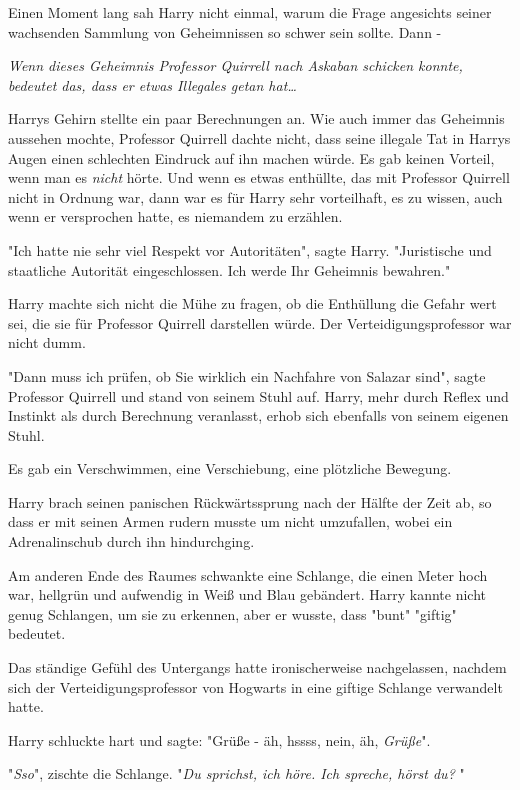 {Einen Moment lang sah Harry nicht einmal, warum die Frage angesichts seiner wachsenden Sammlung von Geheimnissen so schwer sein sollte. Dann -

\emph{Wenn dieses Geheimnis Professor Quirrell nach Askaban schicken konnte, bedeutet das, dass er etwas Illegales getan hat…}

Harrys Gehirn stellte ein paar Berechnungen an. Wie auch immer das Geheimnis aussehen mochte, Professor Quirrell dachte nicht, dass seine illegale Tat in Harrys Augen einen schlechten Eindruck auf ihn machen würde. Es gab keinen Vorteil, wenn man es \emph{nicht} hörte. Und wenn es etwas enthüllte, das mit Professor Quirrell nicht in Ordnung war, dann war es für Harry sehr vorteilhaft, es zu wissen, auch wenn er versprochen hatte, es niemandem zu erzählen.

"Ich hatte nie sehr viel Respekt vor Autoritäten", sagte Harry. "Juristische und staatliche Autorität eingeschlossen. Ich werde Ihr Geheimnis bewahren."

Harry machte sich nicht die Mühe zu fragen, ob die Enthüllung die Gefahr wert sei, die sie für Professor Quirrell darstellen würde. Der Verteidigungsprofessor war nicht dumm.

"Dann muss ich prüfen, ob Sie wirklich ein Nachfahre von Salazar sind", sagte Professor Quirrell und stand von seinem Stuhl auf. Harry, mehr durch Reflex und Instinkt als durch Berechnung veranlasst, erhob sich ebenfalls von seinem eigenen Stuhl.

Es gab ein Verschwimmen, eine Verschiebung, eine plötzliche Bewegung.

Harry brach seinen panischen Rückwärtssprung nach der Hälfte der Zeit ab, so dass er mit seinen Armen rudern musste um nicht umzufallen, wobei ein Adrenalinschub durch ihn hindurchging.

Am anderen Ende des Raumes schwankte eine Schlange, die einen Meter hoch war, hellgrün und aufwendig in Weiß und Blau gebändert. Harry kannte nicht genug Schlangen, um sie zu erkennen, aber er wusste, dass "bunt" "giftig" bedeutet.

Das ständige Gefühl des Untergangs hatte ironischerweise nachgelassen, nachdem sich der Verteidigungsprofessor von Hogwarts in eine giftige Schlange verwandelt hatte.

Harry schluckte hart und sagte: "Grüße - äh, hssss, nein, äh, \emph{Grüße}".

"\emph{Sso}", zischte die Schlange. "\emph{Du sprichst, ich höre. Ich spreche, hörst du?} "

}
